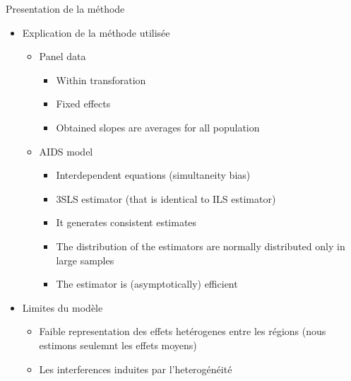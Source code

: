 \documentclass[11pt,ignorenonframetext,]{beamer}
\providecommand{\tightlist}{%
  \setlength{\itemsep}{0pt}\setlength{\parskip}{0pt}}
\begin{document}
\begin{frame}{Presentation de la méthode}
\protect\hypertarget{presentation-de-la-methode}{}

\begin{itemize}
\tightlist
\item
  Explication de la méthode utilisée

  \begin{itemize}
  \tightlist
  \item
    Panel data

    \begin{itemize}
    \tightlist
    \item
      Within transforation
    \item
      Fixed effects
    \item
      Obtained slopes are averages for all population
    \end{itemize}
  \item
    AIDS model

    \begin{itemize}
    \tightlist
    \item
      Interdependent equations (simultaneity bias)
    \item
      3SLS estimator (that is identical to ILS estimator)
    \item
      It generates consistent estimates
    \item
      The distribution of the estimators are normally distributed only
      in large samples
    \item
      The estimator is (asymptotically) efficient
    \end{itemize}
  \end{itemize}
\item
  Limites du modèle

  \begin{itemize}
  \tightlist
  \item
    Faible representation des effets hetérogenes entre les régions (nous
    estimons seulemnt les effets moyens)
  \item
    Les interferences induites par l'heterogénéité
  \end{itemize}
\end{itemize}

\end{frame}
\end{document}
